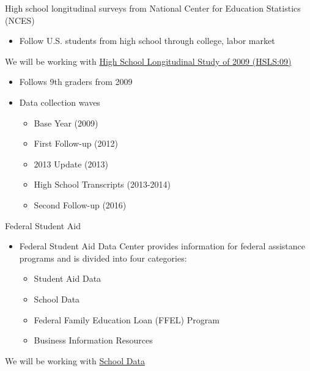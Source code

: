 \documentclass[8pt,ignorenonframetext,dvipsnames]{beamer}
\providecommand{\tightlist}{%
  \setlength{\itemsep}{0pt}\setlength{\parskip}{0pt}}
\begin{document}
\begin{frame}{High school longitudinal surveys from National Center for
Education Statistics (NCES)}

\begin{itemize}
\tightlist
\item
  Follow U.S. students from high school through college, labor market
\end{itemize}

We will be working with
\href{https://nces.ed.gov/surveys/hsls09/index.asp}{High School
Longitudinal Study of 2009 (HSLS:09)}

\begin{itemize}
\tightlist
\item
  Follows 9th graders from 2009
\item
  Data collection waves

  \begin{itemize}
  \tightlist
  \item
    Base Year (2009)
  \item
    First Follow-up (2012)
  \item
    2013 Update (2013)
  \item
    High School Transcripts (2013-2014)
  \item
    Second Follow-up (2016)
  \end{itemize}
\end{itemize}

\end{frame}

\begin{frame}{Federal Student Aid}

\begin{itemize}
\tightlist
\item
  Federal Student Aid Data Center provides information for federal
  assistance programs and is divided into four categories:

  \begin{itemize}
  \tightlist
  \item
    Student Aid Data\\
  \item
    School Data\\
  \item
    Federal Family Education Loan (FFEL) Program\\
  \item
    Business Information Resources
  \end{itemize}
\end{itemize}

We will be working with
\href{https://studentaid.ed.gov/sa/node/105}{School Data}

\end{frame}
\end{document}
